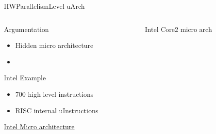 %
\begin{Frame}{HWParallelismLevel uArch}
  \begin{columns}[t]
    \begin{column}{5cm} %
      \begin{block}{Argumentation}
        \begin{itemize}
        \item Hidden micro architecture
        \item 
        \end{itemize}
      \end{block} 
      \begin{block}{Intel Example}
        \begin{itemize}
        \item 700 high level instructions
        \item RISC internal uInstructions
        \end{itemize}
        \href{https://en.wikipedia.org/wiki/Microarchitecture}{Intel
          Micro architecture}
      \end{block}   
    \end{column}
    
    \begin{column}{5cm} %
      \begin{block}{Intel Core2 micro arch}
      \end{block}
    \end{column}
  \end{columns}  
\end{Frame}


